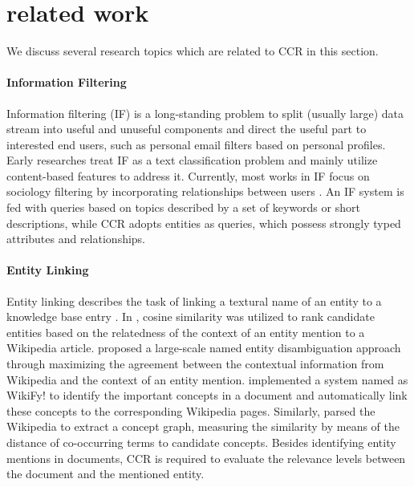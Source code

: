 \documentclass{sig-alternate}
\begin{document}
\section{related work}\label{sec:related-work}
We discuss several research topics which are related to CCR in this section.
\paragraph{Information Filtering}
Information filtering (IF) is a long-standing problem to split (usually large) data stream into useful and unuseful components and direct the useful part to interested end users, such as personal email filters based on personal profiles. Early researches treat IF as a text classification problem and mainly utilize content-based features \cite{Caulkins2006144, Sriram:2010:STC:1835449.1835643, Azzopardi:2009LNCS} to address it. Currently, most works in IF focus on sociology filtering by incorporating relationships between users \cite{Nanas:2010:NMH:1835449.1835485}. An IF system is fed with queries based on topics described by a set of keywords or short descriptions, while CCR adopts entities as queries, which possess strongly typed attributes and relationships.

\paragraph{Entity Linking}
Entity linking describes the task of linking a textural name of an entity to a knowledge base entry \cite{mcnamee2009overview}. In \cite{bunescu:eacl06}, cosine similarity was utilized to rank candidate entities based on the relatedness of the context of an entity mention to a Wikipedia article. \cite{cucerzan:2007:EMNLP-CoNLL2007} proposed a large-scale named entity disambiguation approach through maximizing the agreement between the contextual information from Wikipedia and the context of an entity mention. \cite{mihalcea2007wikify} implemented a system named as WikiFy! to identify the important concepts in a document and automatically link these concepts to the corresponding Wikipedia pages. Similarly, \cite{Han:2009:NED:1645953.1645983} parsed the Wikipedia to extract a concept graph, measuring the similarity by means of the distance of co-occurring terms to candidate concepts. Besides identifying entity mentions in documents, CCR is required to evaluate the relevance levels between the document and the mentioned entity.
\end{document}
